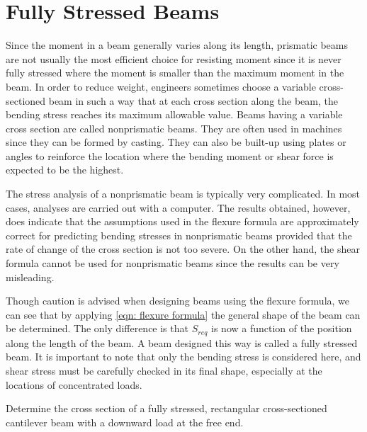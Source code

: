 \documentclass[
10pt,
a4paper,
openany,
svgnames,
]{book}
\begin{document}
\section{Fully Stressed Beams}

Since the moment in a beam generally varies along its length, prismatic beams are not usually the most efficient choice for resisting moment since it is never fully stressed where the moment is smaller than the maximum moment in the beam. In order to reduce weight, engineers sometimes choose a variable cross-sectioned beam in such a way that at each cross section along the beam, the bending stress reaches its maximum allowable value. Beams having a variable cross section are called nonprismatic beams. They are often used in machines since they can be formed by casting. They can also be built-up using plates or angles to reinforce the location where the bending moment or shear force is expected to be the highest.

The stress analysis of a nonprismatic beam is typically very complicated. In most cases, analyses are carried out with a computer. The results obtained, however, does indicate that the assumptions used in the flexure formula are approximately correct for predicting bending stresses in nonprismatic beams provided that the rate of change of the cross section is not too severe. On the other hand, the shear formula cannot be used for nonprismatic beams since the results can be very misleading.

Though caution is advised when designing beams using the flexure formula, we can see that by applying \cref{eqn: flexure formula} the general shape of the beam can be determined. The only difference is that $S_{req}$ is now a function of the position along the length of the beam. A beam designed this way is called a fully stressed beam. It is important to note that only the bending stress is considered here, and shear stress must be carefully checked in its final shape, especially at the locations of concentrated loads.

\begin{example}

  Determine the cross section of a fully stressed, rectangular cross-sectioned cantilever beam with a downward load at the free end.
\end{example}
\end{document}
